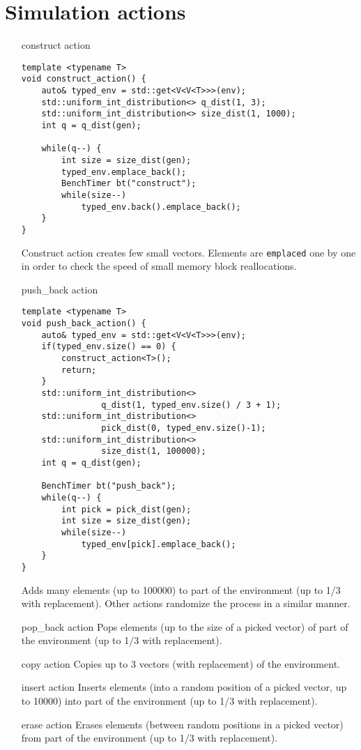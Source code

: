 \documentclass[inz, english, shortabstract]{iithesis}
\begin{document}
\section{Simulation actions}
\begin{itemize}
\item [construct action]
\begin{lstlisting}[caption=construct action]
template <typename T>
void construct_action() {
	auto& typed_env = std::get<V<V<T>>>(env);
	std::uniform_int_distribution<> q_dist(1, 3);
	std::uniform_int_distribution<> size_dist(1, 1000);
	int q = q_dist(gen);
	
	while(q--) {
		int size = size_dist(gen);
		typed_env.emplace_back();
		BenchTimer bt("construct");
		while(size--)
			typed_env.back().emplace_back();
	}
}
\end{lstlisting}
Construct action creates few small vectors. Elements are {\tt emplaced} one by one in order to check the speed of small memory block reallocations. 

\item [push\_back action]
\begin{lstlisting}[caption=push\_back action]
template <typename T>
void push_back_action() {
	auto& typed_env = std::get<V<V<T>>>(env);
	if(typed_env.size() == 0) {
		construct_action<T>();
		return;
	}
	std::uniform_int_distribution<> 
				q_dist(1, typed_env.size() / 3 + 1);
	std::uniform_int_distribution<> 
				pick_dist(0, typed_env.size()-1);
	std::uniform_int_distribution<> 
				size_dist(1, 100000);
	int q = q_dist(gen);
	
	BenchTimer bt("push_back");
	while(q--) {
		int pick = pick_dist(gen);
		int size = size_dist(gen);
		while(size--)
			typed_env[pick].emplace_back();
	}
}
\end{lstlisting}
Adds many elements (up to 100000) to part of the environment (up to 1/3 with replacement). Other actions randomize the process in a similar manner.

\item [pop\_back action]
Pops elements (up to the size of a picked vector) of part of the environment (up to 1/3 with replacement). 

\item [copy action]
Copies up to 3 vectors (with replacement) of the environment.

\item[insert action]
Inserts elements (into a random position of a picked vector, up to 10000) into part of the environment (up to 1/3 with replacement).

\item[erase action]
Erases elements (between random positions in a picked vector) from part of the environment (up to 1/3 with replacement).
\end{itemize}
\end{document}
